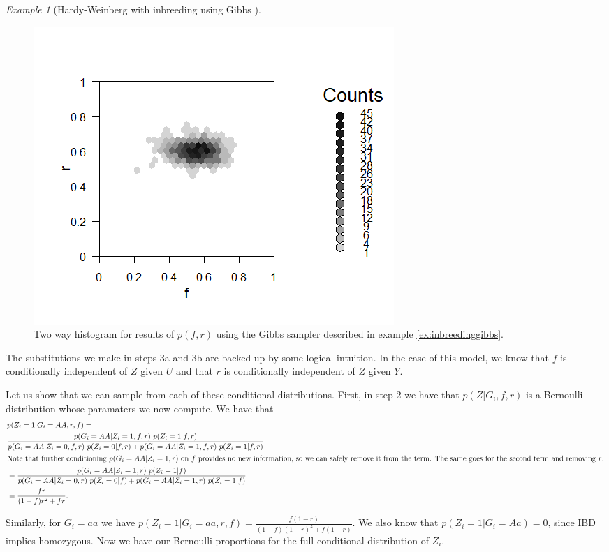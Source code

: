 \documentclass[11pt]{amsart}
\theoremstyle{theorem} %
\theoremstyle{definition}                  %
\theoremstyle{example}                       %
\theoremstyle{remark}                       %
\newtheorem{exmp}[thm]{Example}  %
\numberwithin{equation}{section}
\begin{document}
\begin{exmp}[{Hardy-Weinberg with inbreeding using Gibbs \cite{stephens}}]
\begin{figure}[h]
    \centering
    \includegraphics[width= .75\textwidth]{gibbsinbreeding1.png}
    \caption{Two way histogram for results of $p(f,r)$ using the Gibbs sampler described in example \ref{ex:inbreedinggibbs}.}
    \label{fig:inbreedinggibbs}
\end{figure}

The substitutions we make in steps 3a and 3b are backed up by some logical intuition. In the case of this model, we know that $f$ is conditionally independent of $Z$ given $U$ and that $r$ is conditionally independent of $Z$ given $Y$.


Let us show that we can sample from each of these conditional distributions. First, in step 2 we have that $p(Z|G_i,f,r)$ is a Bernoulli distribution whose paramaters we now compute. We have that
\begin{align*}
&p(Z_i = 1 | G_i = AA, r, f) =\\
&\frac{p(G_i=AA|Z_i=1, f, r) ~p(Z_i=1|f, r)}{p(G_i=AA|Z_i=0, f, r)~p(Z_i=0|f, r) + p(G_i=AA|Z_i=1, f, r)~p(Z_i=1|f, r)}\\
\intertext{Note that further conditioning $p(G_i=AA|Z_i=1, r)$ on $f$ provides no new information, so we can safely remove it from the term. The same goes for the second term and removing $r$:}
&=\frac{p(G_i=AA|Z_i=1, r) ~p(Z_i=1|f)}{p(G_i=AA|Z_i=0, r)~p(Z_i=0|f) + p(G_i=AA|Z_i=1, r)~p(Z_i=1|f)}\\
&= \frac{fr}{(1-f)r^2 + fr}.
\end{align*}

Similarly, for $G_i=aa$ we have $p(Z_i = 1 | G_i = aa, r, f)=\frac{f(1-r)}{(1-f)(1-r)^2+f(1-r)}$. We also know that $p(Z_i=1|G_i=Aa)=0$, since IBD implies homozygous. Now we have our Bernoulli proportions for the full conditional distribution of $Z_i$.


\end{exmp}
\end{document}
